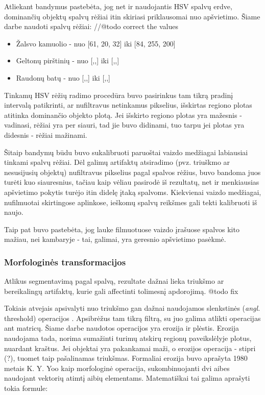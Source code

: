 \documentclass{VUMIFPSbakalaurinis}
\begin{document}
Atliekant bandymus pastebėta, jog net ir naudojantis HSV spalvų erdve, dominančių objektų spalvų rėžiai itin skiriasi priklausomai nuo apšvietimo. Šiame darbe naudoti spalvų rėžiai: //@todo correct the values

\begin{itemize} 
	\item Žalsvo kamuolio - nuo [61, 20, 32] iki [84, 255, 200]
	\item Geltonų pirštinių - nuo [,,] iki [,,]
	\item Raudonų batų - nuo [,,] iki [,,]
\end{itemize}

Tinkamų HSV rėžių radimo procedūra buvo pasirinkus tam tikrą pradinį intervalą patikrinti, ar nufiltravus netinkamus pikselius, išskirtas regiono plotas atitinka dominančio objekto plotą. Jei išskirto regiono plotas yra mažesnis - vadinasi, rėžiai yra per siauri, tad jie buvo didinami, tuo tarpu jei plotas yra didesnis - rėžiai mažinami. 

Šitaip bandymų būdu buvo sukalibruoti paruoštai vaizdo medžiagai labiausiai tinkami spalvų rėžiai. Dėl galimų artifaktų atsiradimo (pvz. triuškmo ar nesusijusių objektų) nufiltravus pikselius pagal spalvos rėžius, buvo bandoma juos turėti kuo siauresnius, tačiau kaip vėliau pasirodė iš rezultatų, net ir menkiausias apšvietimo pokytis turėjo itin didelę įtaką spalvoms. Kiekvienai vaizdo medžiagai, nufilmuotai skirtingose aplinkose, ieškomų spalvų reikšmes gali tekti kalibruoti iš naujo.

Taip pat buvo pastebėta, jog lauke filmuotuose vaizdo įrašuose spalvos kito mažiau, nei kambaryje - tai, galimai, yra geresnio apšvietimo pasėkmė. 

\subsubsection{Morfologinės transformacijos}
Atlikus segmentavimą pagal spalvą, rezultate dažnai lieka triukšmo ar bereikalingų artifaktų, kurie gali affectinti tolimesnį apdorojimą. @todo fix

Tokiais atvejais apsivalyti nuo triukšmo gan dažnai naudojamos slenkstinės (\textit{angl.} threshold) operacijos \cite[112]{SzeliskiCompVision}. Apsibrėžus tam tikrą filtrą, su juo galima atlikti operacijas ant matricų. Šiame darbe naudotos operacijos yra erozija ir plėstis. Erozija naudojama tada, norima sumažinti turimų atskirų regionų paveikslėlyje plotus, nuardant kraštus. Jei objektai yra pakankamai maži, o erozijos operacija - stipri (?), tuomet taip pašalinamas triukšmas. Formaliai erozija buvo aprašyta 1980 metais K. Y. Yoo \cite{4767941} kaip morfologinė operacija, sukombinuojanti dvi aibes naudojant vektorių atimtį aibių elementams. Matematiškai tai galima aprašyti tokia formule: 
\end{document}
